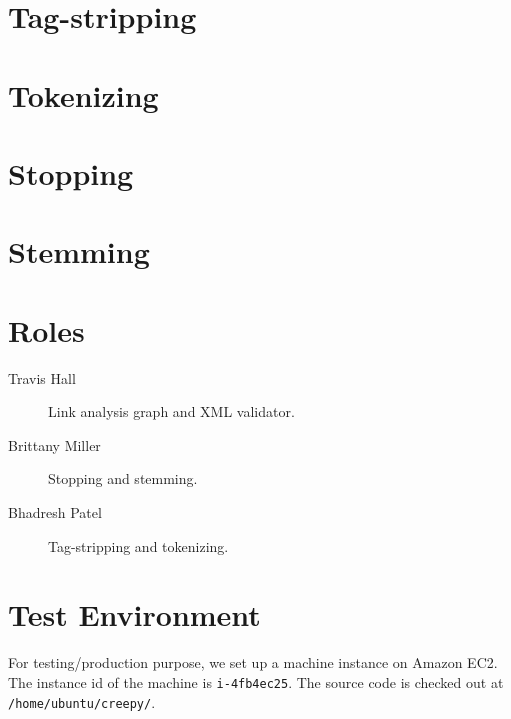\documentclass[letterpaper,11pt,twoside]{article}
\begin{document}
\section{Tag-stripping}

\section{Tokenizing}

\section{Stopping}

\section{Stemming}


\section{Roles}
\begin{description}
 \item[Travis Hall] Link analysis graph and XML validator.
 \item[Brittany Miller] Stopping and stemming.
 \item[Bhadresh Patel] Tag-stripping and tokenizing.
\end{description}

\section{Test Environment}
For testing/production purpose, we set up a machine instance on Amazon EC2. The instance id of the machine is \texttt{i-4fb4ec25}. The source code is checked out at \texttt{/home/ubuntu/creepy/}.
\end{document}
